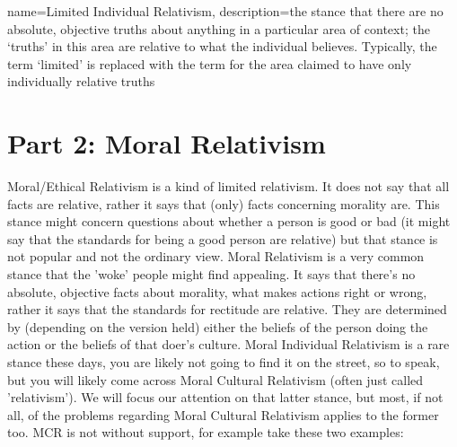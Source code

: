 {
  name=Limited Individual Relativism,
  description={the stance that there are no absolute, objective truths about anything in a particular area of context; the `truths' in this area are relative to what the individual believes. Typically, the term `limited' is replaced with the term for the area claimed to have only individually relative truths}
}


\begin{center}
\end{center}




\chapter{Part 2: Moral Relativism}

Moral/Ethical Relativism is a kind of limited relativism. It does not say that all facts are relative, rather it says that (only) facts concerning morality are. This stance might concern questions about whether a person is good or bad (it might say that the standards for being a good person are relative) but that stance is not popular and not the ordinary view. Moral Relativism is a very common stance that the 'woke' people might find appealing. It says that there's no absolute, objective facts about morality, what makes actions right or wrong, rather it says that the standards for rectitude are relative. They are determined by (depending on the version held) either the beliefs of the person doing the action or the beliefs of that doer's culture. Moral Individual Relativism is a rare stance these days, you are likely not going to find it on the street, so to speak, but you will likely come across  \gls{Moral Cultural Relativism} (often just called 'relativism'). We will focus our attention on that latter stance, but most, if not all, of the problems regarding Moral Cultural Relativism applies to the former too. MCR is not without support, for example take these two examples:

